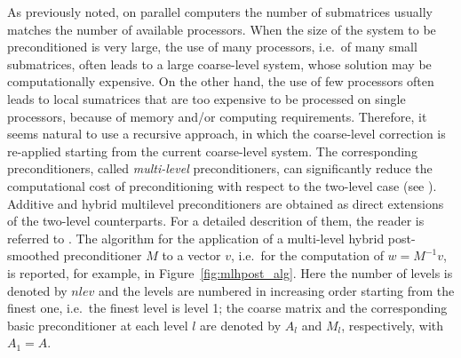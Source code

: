 As previously noted, on parallel computers the number of submatrices usually matches
the number of available processors. When the size of the system to be preconditioned
is very large, the use of many processors, i.e.\ of many small submatrices, often
leads to a large coarse-level system, whose solution may be computationally expensive.
On the other hand, the use of few processors often leads to local sumatrices that
are too expensive to be processed on single processors, because of memory and/or
computing requirements. Therefore, it seems natural to use a recursive approach,
in which the coarse-level correction is re-applied starting from the current
coarse-level system. The corresponding preconditioners, called \emph{multi-level}
preconditioners, can significantly reduce the computational cost of preconditioning
with respect to the two-level case (see \cite[Chapter 3]{dd2_96}). 
Additive and hybrid multilevel preconditioners
are obtained as direct extensions of the two-level counterparts.
For a detailed descrition of them, the reader is
referred to \cite[Chapter 3]{dd2_96}.
The algorithm for the application of a multi-level hybrid 
post-smoothed preconditioner $M$ to a vector $v$, i.e.\ for the
computation of $w=M^{-1}v$, is reported, for
example, in Figure~\ref{fig:mlhpost_alg}. Here the number of levels
is denoted by $nlev$ and the levels are numbered in increasing order starting
from the finest one, i.e.\ the finest level is level 1; the coarse matrix
and the corresponding basic preconditioner at each level $l$ are denoted by $A_l$ and
$M_l$, respectively, with $A_1=A$.
% 
